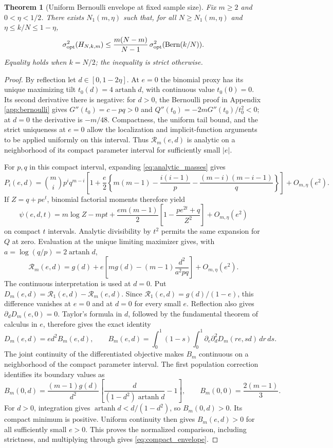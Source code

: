 \documentclass[11pt,a4paper]{article}
\newtheorem{theorem}{Theorem}[section]
\begin{document}
\begin{theorem}[Uniform Bernoulli envelope at fixed sample size]\label{thm:compact_contraction}
Fix $m\ge2$ and $0<\eta<1/2$. There exists $N_1(m,\eta)$ such that, for all $N\ge N_1(m,\eta)$ and $\eta\le k/N\le1-\eta$,
\begin{equation}\label{eq:compact_envelope}
 \sigma^2_{\mathrm{opt}}(H_{N,k,m})
 \le\frac{m(N-m)}{N-1}\,
 \sigma^2_{\mathrm{opt}}(\operatorname{Bern}(k/N)).
\end{equation}
Equality holds when $k=N/2$; the inequality is strict otherwise.
\end{theorem}
\begin{proof}
By reflection let $d\in[0,1-2\eta]$. At $e=0$ the binomial proxy has its unique maximizing tilt $t_0(d)=4\operatorname{artanh}d$, with continuous value $t_0(0)=0$. Its second derivative there is negative: for $d>0$, the Bernoulli proof in Appendix \ref{app:bernoulli} gives $G''(t_0)=c-pq>0$ and $Q''(t_0)=-2mG''(t_0)/t_0^2<0$; at $d=0$ the derivative is $-m/48$. Compactness, the uniform tail bound, and the strict uniqueness at $e=0$ allow the localization and implicit-function arguments to be applied uniformly on this interval. Thus $\mathcal R_m(e,d)$ is analytic on a neighborhood of its compact parameter interval for sufficiently small $|e|$.

For $p,q$ in this compact interval, expanding \eqref{eq:analytic_masses} gives
\[
 P_i(e,d)=\binom mi p^iq^{m-i}\left[
 1+\frac e2\left\{m(m-1)-\frac{i(i-1)}p
 -\frac{(m-i)(m-i-1)}q\right\}\right]+O_{m,\eta}(e^2).
\]
If $Z=q+pe^t$, binomial factorial moments therefore yield
\begin{equation}\label{eq:first_order_psi}
 \psi(e,d,t)=m\log Z-mpt+
 \frac{em(m-1)}2\left[1-\frac{pe^{2t}+q}{Z^2}\right]+O_{m,\eta}(e^2)
\end{equation}
on compact $t$ intervals. Analytic divisibility by $t^2$ permits the same expansion for $Q$ at zero. Evaluation at the unique limiting maximizer gives, with $a=\log(q/p)=2\operatorname{artanh}d$,
\[
 \mathcal R_m(e,d)=g(d)+e\left[m g(d)-(m-1)\frac{d^2}{a^2pq}\right]+O_{m,\eta}(e^2).
\]
The continuous interpretation is used at $d=0$. Put $D_m(e,d)=\mathcal R_1(e,d)-\mathcal R_m(e,d)$. Since $\mathcal R_1(e,d)=g(d)/(1-e)$, this difference vanishes at $e=0$ and at $d=0$ for every small $e$. Reflection also gives $\partial_d D_m(e,0)=0$. Taylor's formula in $d$, followed by the fundamental theorem of calculus in $e$, therefore gives the exact identity
\[
 D_m(e,d)=e d^2 B_m(e,d),\qquad
 B_m(e,d)=\int_0^1(1-s)\int_0^1
 \partial_e\partial_d^2D_m(re,sd)\,dr\,ds.
\]
The joint continuity of the differentiated objective makes $B_m$ continuous on a neighborhood of the compact parameter interval. The first population correction identifies its boundary values as
\[
 B_m(0,d)=\frac{(m-1)g(d)}{d^2}
 \left[\frac{d}{(1-d^2)\operatorname{artanh}d}-1\right],
 \qquad B_m(0,0)=\frac{2(m-1)}3.
\]
For $d>0$, integration gives $\operatorname{artanh}d<d/(1-d^2)$, so $B_m(0,d)>0$. Its compact minimum is positive. Uniform continuity then gives $B_m(e,d)>0$ for all sufficiently small $e>0$. This proves the normalized comparison, including strictness, and multiplying through gives \eqref{eq:compact_envelope}.
\end{proof}
\end{document}
